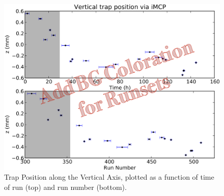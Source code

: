 \begin{figure}[h!!t]
	\centering
	\includegraphics[width=.999\linewidth]
	{Figures/VerticalTrap_by_rMCP_prelim}
	\caption[Vertical Trap Position from rMCP]{Trap Position along the Vertical Axis, plotted as a function of time of run (top) and run number (bottom).}	
	\label{fig:vposition_by_run_rmcp}
\end{figure}





